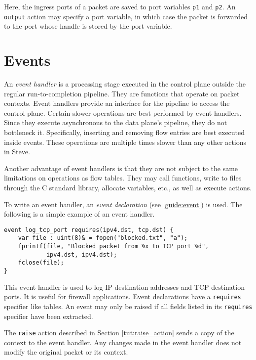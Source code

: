 Here, the ingress ports of a packet are saved to port variables \texttt{p1} and \texttt{p2}. An \texttt{output} action may specify a port variable, in which case the packet is forwarded to the port whose handle is stored by the port variable.

\section{Events} \label{tut:event}

An \textit{event handler} is a processing stage executed in the control plane outside the regular
run-to-completion pipeline. They are
functions that operate on packet contexts. 
Event handlers provide an interface for the pipeline to access the control
plane. Certain slower operations
are best performed by event handlers. Since they execute asynchronous to the
data plane's pipeline, they do not bottleneck it.
Specifically, inserting and removing flow entries are best executed inside
events. These operations are multiple times slower
than any other actions in Steve.

Another advantage of event handlers is that they are not subject to the same
limitations on operations as flow tables. They may call functions,
write to files through the C standard library, allocate variables, etc., as
well as execute actions.

To write an event handler, an \textit{event declaration}
(see \ref{guide:event}) is used. The following is a simple example
of an event handler.

\begin{codepage}
\begin{lstlisting}
event log_tcp_port requires(ipv4.dst, tcp.dst) {
	var file : uint(8)& = fopen("blocked.txt", "a");
	fprintf(file, "Blocked packet from %x to TCP port %d", 
			ipv4.dst, ipv4.dst);
	fclose(file);
}
\end{lstlisting}
\end{codepage}

This event handler is used to log IP destination addresses and
TCP destination ports. It is useful for firewall applications.
Event declarations have a \texttt{requires} specifier
like tables. An event may only be raised if all fields listed in its
\texttt{requires} specifier have been extracted.

The \texttt{raise} action described in Section \ref{tut:raise_action}
sends a copy of the context to the event handler.
Any changes made in the event handler does not modify the
original packet or its context.

